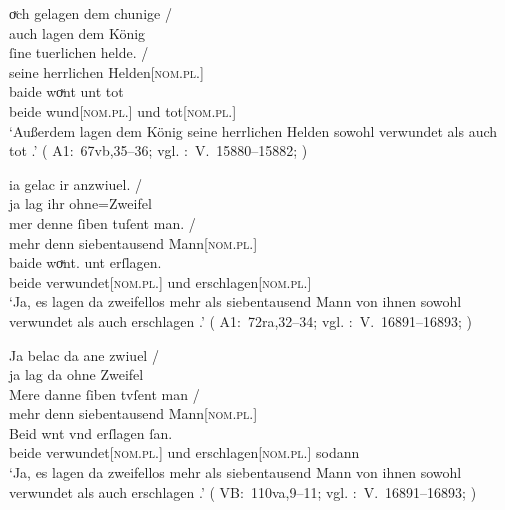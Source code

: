\begin{exe}
\ex \label{ex:konjadjvvbeide}
    \begin{xlist}
	\ex \label{ex:konjadjvvbeide_1} %
		\gll oͮch gelagen dem chunige {/} \\
			auch lagen dem König \\
		\gll ſine tuerlichen helde. {/} \\
			seine herrlichen Helden[\textsc{nom.pl.\MascM}] \\
		\gll baide woͮnt unt tot \\
			beide wund[\textsc{nom.pl.\MascM}] und tot[\textsc{nom.pl.\MascM}] \\
		\trans `Außerdem lagen dem König seine herrlichen Helden
				sowohl verwundet als auch tot .'
			(%
				A1:~67vb,35--36; vgl.
				\KC:~V.~15880--15882;
				\cite[368]{schroeder1895}%
			)
	
	\ex \label{ex:konjadjvvbeide_2} %
		\gll ia gelac ir anzwiuel. {/} \\
			ja lag ihr ohne=Zweifel \\
		\gll mer denne {ſiben tuſent} man. {/} \\
			mehr denn siebentausend Mann[\textsc{nom.pl.\MascM}] \\
		\gll baide woͮnt. unt erſlagen. \\
			beide verwundet[\textsc{nom.pl.\MascM}] und erschlagen[\textsc{nom.pl.\MascM}] \\
		\trans `Ja, es lagen da zweifellos mehr als siebentausend Mann
			von ihnen sowohl verwundet als auch erschlagen .'
			(%
				A1:~72ra,32--34; vgl.
				\KC:~V.~16891--16893;
				\cite[386]{schroeder1895}%
			)
	
	\ex \label{ex:konjadjvvbeide_3} %
		\gll Ja belac da ane zwiuel {/} \\
			ja lag da ohne Zweifel \\
		\gll Mere danne {ſiben tvſent} man {/} \\
			mehr denn siebentausend Mann[\textsc{nom.pl.\MascM}] \\
		\gll Beid wnt vnd erſlagen ſan. \\
			beide verwundet[\textsc{nom.pl.\MascM}] und erschlagen[\textsc{nom.pl.\MascM}]
			sodann \\
		\trans `Ja, es lagen da zweifellos mehr als siebentausend Mann
			von ihnen sowohl verwundet als auch erschlagen .'
			(%
				VB:~110va,9--11; vgl.
				\KC:~V.~16891--16893;
				\cite[386]{schroeder1895}%
			)


\end{xlist}
\end{exe}

